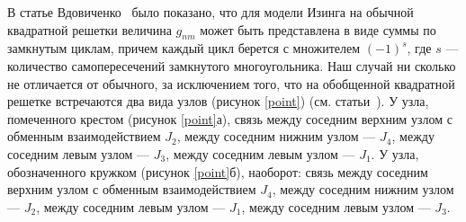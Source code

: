 \documentclass[utf8,12pt]{jetp}
\begin{document}
В статье Вдовиченко~\cite{vdovichenko1965} было показано, что для модели Изинга на обычной квадратной решетки величина $g_{nm}$ может быть представлена в виде суммы по замкнутым циклам, причем каждый цикл берется с множителем $(-1)^s$, где $s$ --- количество самопересечений замкнутого многоугольника. Наш случай ни сколько не отличается от обычного, за исключением того, что на обобщенной квадратной решетке встречаются два вида узлов (рисунок \ref{point}) (см. статьи~\cite{vaks1966, chikyu1987}). У узла, помеченного крестом (рисунок \ref{point}а), связь между соседним верхним узлом с обменным взаимодействием $J_2$, между соседним нижним узлом --- $J_4$, между соседним левым узлом --- $J_3$, между соседним левым узлом --- $J_1$. У узла, обозначенного кружком (рисунок \ref{point}б), наоборот: связь между соседним верхним узлом с обменным взаимодействием $J_4$, между соседним нижним узлом --- $J_2$, между соседним левым узлом --- $J_1$, между соседним левым узлом --- $J_3$. 
\end{document}
